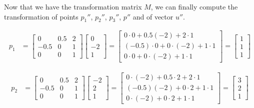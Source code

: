 \documentclass{article}
\begin{document}
\pagebreak
\noindent Now that we have the transformation matrix $M$, we can finally compute the transformation of points $p_1''$, $p_2''$, $p_3''$, $p''$ and of vector $u''$.

\begin{align*}
	p_1 & = \begin{bmatrix}0&0.5&2\\ -0.5&0&1\\ 0&0&1\end{bmatrix} \begin{bmatrix}0\\ -2\\ 1\end{bmatrix} = \begin{bmatrix}0\cdot 0+0.5\left(-2\right)+2\cdot 1\\ \left(-0.5\right)\cdot 0+0\cdot \left(-2\right)+1\cdot 1\\ 0\cdot 0+0\cdot \left(-2\right)+1\cdot 1\end{bmatrix} = \begin{bmatrix}1\\ 1\\ 1\end{bmatrix}
\end{align*}

\begin{align*}
	p_2 & = \begin{bmatrix}0&0.5&2\\ -0.5&0&1\\ 0&0&1\end{bmatrix} \begin{bmatrix}-2\\ 2\\ 1\end{bmatrix} = \begin{bmatrix}0\cdot \left(-2\right)+0.5\cdot 2+2\cdot 1\\ \left(-0.5\right)\left(-2\right)+0\cdot 2+1\cdot 1\\ 0\cdot \left(-2\right)+0\cdot 2+1\cdot 1\end{bmatrix} = \begin{bmatrix}3\\ 2\\ 1\end{bmatrix}
\end{align*}
\end{document}
